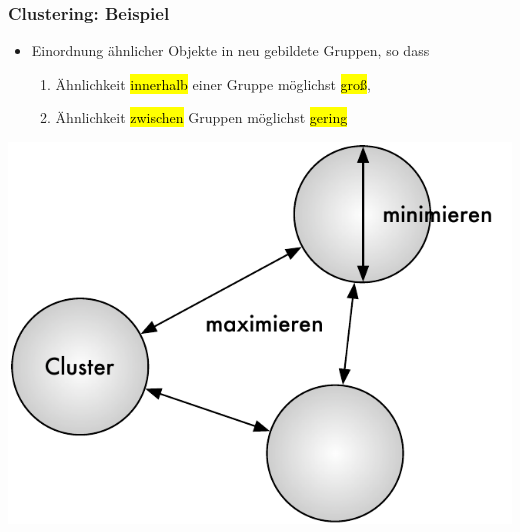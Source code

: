 
\begin{frame}[c]
\frametitle{Clustering: Beispiel}

\begin{minipage}[c]{5.5cm}
\begin{itemize}
\item Einordnung ähnlicher Objekte in neu gebildete Gruppen, so dass
\begin{enumerate}
\item Ähnlichkeit \hl{innerhalb} einer Gruppe möglichst \hl{groß},
\item Ähnlichkeit \hl{zwischen} Gruppen möglichst \hl{gering}
\end{enumerate}
\end{itemize}
\end{minipage}\quad
\begin{minipage}[c]{4cm}
\includegraphics[scale=.5]{fig1/cluster.pdf}
\end{minipage}

\end{frame}



